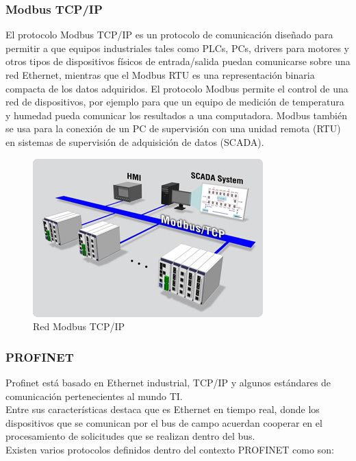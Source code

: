 \documentclass[12pt,titlepage]{article}
\begin{document}
\subsubsection{Modbus TCP/IP}
El protocolo Modbus TCP/IP es un protocolo de comunicación diseñado para permitir a que equipos industriales tales como PLCs, PCs, drivers para motores y otros tipos de dispositivos físicos de entrada/salida puedan comunicarse sobre una red Ethernet, mientras que el Modbus RTU  es una representación binaria compacta de los datos adquiridos. El protocolo Modbus permite el control de una red de dispositivos, por ejemplo para que un equipo de medición de temperatura y humedad pueda comunicar los resultados a una computadora. Modbus también se usa para la conexión de un PC de supervisión con una unidad remota (RTU) en sistemas de supervisión de adquisición de datos (SCADA). \\ [0.8mm] 

\begin{figure}[htbp]
\hspace*{3.6cm} 
\includegraphics[scale=0.89]{red_modbus}
\caption{Red Modbus TCP/IP}
\end{figure}

\newpage

\subsubsection{PROFINET}
Profinet está basado en Ethernet industrial, TCP/IP y algunos estándares de comunicación pertenecientes al mundo TI. \\
Entre sus características destaca que es Ethernet en tiempo real, donde los dispositivos que se comunican por el bus de campo acuerdan cooperar en el procesamiento de solicitudes que se realizan dentro del bus. \\[0.7mm] 

Existen varios protocolos definidos dentro del contexto PROFINET como son: \\
\end{document}
